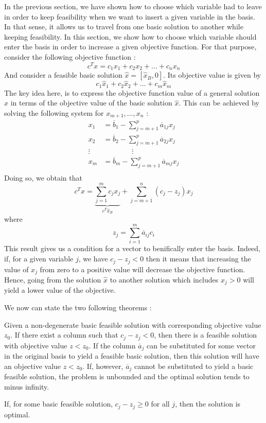 In the previous section, we have shown how to choose which variable had to leave in order to keep feasibility when we want to insert a given variable in the basis. In that sense, it allows us to travel from one basic solution to another while keeping feasibility. In this section, we show how to choose which variable should enter the basis in order to increase a given objective function. For that purpose, consider the following objective function : \[ c^Tx = c_1x_1 + c_2x_2 + ... + c_nx_n \] And consider a feasible basic solution $\hat x = [\hat x_B, 0]$. Its objective value is given by \[ c_1\hat x_1 + c_2\hat x_2 + ... + c_m\hat x_m \] The key idea here, is to express the objective function value of a general solution $x$ in terms of the objective value of the basic solution $\hat x$. This can be achieved by solving the following system for $x_{m+1},...,x_n$ :
\begin{align*}
    x_1 &= \overline b_1 - \sum_{j=m+1}^p \overline a_{1j}x_j \\
    x_2 &= \overline b_2 - \sum_{j=m+1}^p \overline a_{2j}x_j \\
    \vdots & \qquad\qquad \vdots \\
    x_m &= \overline b_m - \sum_{j=m+1}^p \overline a_{mj}x_j \\
\end{align*} Doing so, we obtain that \[ c^Tx = \underbrace{\sum_{j=1}^m c_jx_j}_{c^T\hat x_B} + \sum_{j=m+1}^n (c_{j} - z_{j})x_j \] where \[ z_j = \sum_{i=1}^m \overline a_{ij}c_i \] This result gives us a condition for a vector to benifically enter the basis. Indeed, if, for a given variable $j$, we have $c_j - z_j < 0$ then it means that increasing the value of $x_j$ from zero to a positive value will decrease the objective function. Hence, going from the solution $\hat x$ to another solution which includes $x_j > 0$ will yield a lower value of the objective. 

We now can state the two following theorems : 
\begin{theorem}
    Given a non-degenerate basic feasible solution with corresponding objective value $z_0$. If there exist a column such that $c_j - z_j < 0$, then there is a feasible solution with objective value $z < z_0$. If the column $\overline a_j$ can be substituted for some vector in the original basis to yield a feasible basic solution, then this solution will have an objective value $z < z_0$. If, however, $\overline a_j$ cannot be substituted to yield a basic feasible solution, the problem is unbounded and the optimal solution tends to minus infinity. 
\end{theorem}
\begin{theorem}
    If, for some basic feasible solution, $c_j - z_j\ge 0$ for all $j$, then the solution is optimal. 
\end{theorem}


